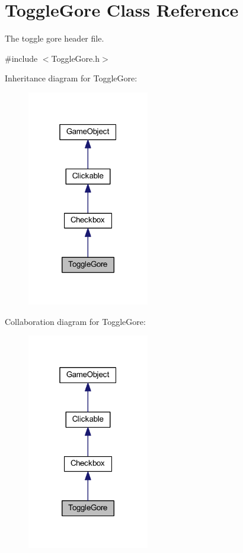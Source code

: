 \hypertarget{class_toggle_gore}{\section{Toggle\+Gore Class Reference}
\label{class_toggle_gore}
}


The toggle gore header file.  




{\ttfamily \#include $<$Toggle\+Gore.\+h$>$}



Inheritance diagram for Toggle\+Gore\+:\nopagebreak
\begin{figure}[H]
\begin{center}
\leavevmode
\includegraphics[width=151pt]{class_toggle_gore__inherit__graph}
\end{center}
\end{figure}


Collaboration diagram for Toggle\+Gore\+:\nopagebreak
\begin{figure}[H]
\begin{center}
\leavevmode
\includegraphics[width=151pt]{class_toggle_gore__coll__graph}
\end{center}
\end{figure}
